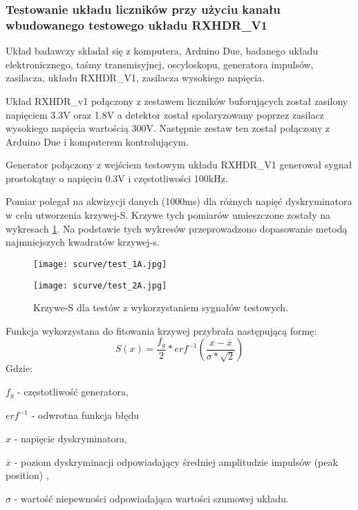 \subsubsection{Testowanie układu liczników przy użyciu kanału wbudowanego testowego układu RXHDR\_V1}
\label{section RXHDR test}

Układ badawczy składał się z komputera, Arduino Due, badanego układu elektronicznego, taśmy transmisyjnej, oscyloskopu, generatora impulsów, zasilacza, układu RXHDR\_V1, zasilacza wysokiego napięcia. 

Układ RXHDR\_v1 połączony z zestawem liczników buforujących został zasilony napięciem 3.3V oraz 1.8V a detektor został spolaryzowany poprzez zasilacz wysokiego napięcia wartością 300V. Następnie zestaw ten został połączony z Arduino Due i komputerem kontrolującym. 

Generator połączony z wejściem testowym układu RXHDR\_V1 generował sygnał prostokątny o napięciu 0.3V i częstotliwości 100kHz. 

Pomiar polegał na akwizycji danych (1000ms) dla różnych napięć dyskryminatora w celu utworzenia krzywej-S. Krzywe tych pomiarów umieszczone zostały na wykresach \ref{s curve test}. Na podstawie tych wykresów przeprowadzono dopasowanie metodą najmniejszych kwadratów krzywej-s.

\begin{figure}
        \centering
        \begin{multicols}{2}
                \texttt{[image: scurve/test\_1A.jpg]} \par
                \texttt{[image: scurve/test\_2A.jpg]} \par
        \end{multicols}
        \caption{Krzywe-S dla testów z wykorzystaniem sygnałów testowych.}\label{s curve test}
\end{figure}

Funkcja wykorzystana do fitowania krzywej przybrała następującą formę:
\begin{equation}
        \label{test eq}
        S(x) = \frac{f_g}{2} * erf^{-1}(\frac{x-\overline{x}}{\sigma*\sqrt{2}})
\end{equation}
Gdzie:
\begin{description}
        \item $f_g$ - częstotliwość generatora,
        \item $erf^{-1}$ - odwrotna funkcja błędu
        \item $x$ - napięcie dyskryminatora,
        \item $\overline{x}$ - poziom dyskryminacji odpowiadający średniej amplitudzie impulsów (peak position) ,
        \item  $\sigma$ - wartość niepewności odpowiadająca wartości szumowej układu. 
\end{description}

